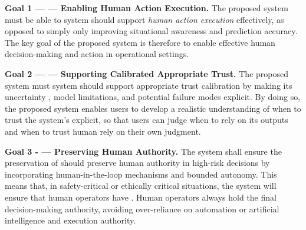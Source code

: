 \documentclass[journal]{IEEEtran}
\theoremstyle{plain}
\theoremstyle{definition}
\providecommand{\DIFaddtex}[1]{{\protect\color{blue} \sf #1}} %
\providecommand{\DIFdeltex}[1]{{\protect\color{red} \scriptsize #1}} %
\providecommand{\DIFaddbegin}{} %
\providecommand{\DIFaddend}{} %
\providecommand{\DIFdelbegin}{} %
\providecommand{\DIFdelend}{} %
\providecommand{\DIFadd}[1]{\texorpdfstring{\DIFaddtex{#1}}{#1}} %
\providecommand{\DIFdel}[1]{\texorpdfstring{\DIFdeltex{#1}}{}} %
\newcommand{\DIFscaledelfig}{0.5}
\newlength{\DIFdelgraphicswidth} %
\newlength{\DIFdelgraphicsheight} %
\newcommand{\DIFaddincludegraphics}[2][]{{\color{blue}\fbox{\DIFOincludegraphics[#1]{#2}}}} %
\newcommand{\DIFdelincludegraphics}[2][]{%
\sbox{\DIFdelgraphicsbox}{\DIFOincludegraphics[#1]{#2}}%
\settoboxwidth{\DIFdelgraphicswidth}{\DIFdelgraphicsbox} %
\settoboxtotalheight{\DIFdelgraphicsheight}{\DIFdelgraphicsbox} %
\scalebox{\DIFscaledelfig}{%
\parbox[b]{\DIFdelgraphicswidth}{\usebox{\DIFdelgraphicsbox}\\[-\baselineskip] \rule{\DIFdelgraphicswidth}{0em}}\llap{\resizebox{\DIFdelgraphicswidth}{\DIFdelgraphicsheight}{%
\setlength{\unitlength}{\DIFdelgraphicswidth}%
\begin{picture}(1,1)%
\thicklines\linethickness{2pt} %
{\color[rgb]{1,0,0}\put(0,0){\framebox(1,1){}}}%
{\color[rgb]{1,0,0}\put(0,0){\line( 1,1){1}}}%
{\color[rgb]{1,0,0}\put(0,1){\line(1,-1){1}}}%
\end{picture}%
}\hspace*{3pt}}} %
} %
\DeclareRobustCommand{\DIFaddbegin}{\DIFOaddbegin \let\includegraphics\DIFaddincludegraphics} %
\DeclareRobustCommand{\DIFaddend}{\DIFOaddend \let\includegraphics\DIFOincludegraphics} %
\DeclareRobustCommand{\DIFdelbegin}{\DIFOdelbegin \let\includegraphics\DIFdelincludegraphics} %
\DeclareRobustCommand{\DIFdelend}{\DIFOaddend \let\includegraphics\DIFOincludegraphics} %
\begin{document}
    \textbf{Goal 1 \DIFdelbegin \DIFdel{— }\DIFdelend \DIFaddbegin \DIFadd{--- }\DIFaddend Enabling Human Action Execution.}
    The \DIFdelbegin \DIFdel{proposed system must be able to }\DIFdelend \DIFaddbegin \DIFadd{system should }\DIFaddend support \emph{human action execution} effectively, as opposed to \DIFdelbegin \DIFdel{simply }\DIFdelend \DIFaddbegin \DIFadd{only }\DIFaddend improving situational awareness and prediction accuracy.
\DIFdelbegin \DIFdel{The key goal of the proposed system is therefore to enable effective human decision-making and action in operational settings.
}\DIFdelend 

    \textbf{Goal 2 \DIFdelbegin \DIFdel{— }\DIFdelend \DIFaddbegin \DIFadd{--- }\DIFaddend Supporting \DIFdelbegin \DIFdel{Calibrated }\DIFdelend \DIFaddbegin \DIFadd{Appropriate }\DIFaddend Trust.}
    The \DIFdelbegin \DIFdel{proposed system must }\DIFdelend \DIFaddbegin \DIFadd{system should }\DIFaddend support appropriate trust \DIFdelbegin \DIFdel{calibration }\DIFdelend \DIFaddbegin \DIFadd{\cite{Lee2004} }\DIFaddend by making its uncertainty \DIFdelbegin \DIFdel{, model limitations, and potential failure modes explicit. By doing so, the proposed system enables users to develop a realistic understanding of when to trust the system's }\DIFdelend \DIFaddbegin \DIFadd{explicit, so that users can judge when to rely on its }\DIFaddend outputs and when to \DIFdelbegin \DIFdel{trust human }\DIFdelend \DIFaddbegin \DIFadd{rely on their own }\DIFaddend judgment.

    \textbf{Goal 3 \DIFdelbegin \DIFdel{- }\DIFdelend \DIFaddbegin \DIFadd{--- }\DIFaddend Preserving Human Authority.}
    The system \DIFdelbegin \DIFdel{shall ensure the preservation of }\DIFdelend \DIFaddbegin \DIFadd{should preserve }\DIFaddend human authority in high-risk decisions\DIFdelbegin \DIFdel{by incorporating human-in-the-loop mechanisms and bounded autonomy. This means that, in safety-critical or ethically critical situations, the system will ensure that human operators have }\DIFdelend \DIFaddbegin \DIFadd{. Human operators always hold }\DIFaddend the final decision-making \DIFdelbegin \DIFdel{authority, avoiding over-reliance on automation or artificial intelligence}\DIFdelend \DIFaddbegin \DIFadd{and execution authority}\DIFaddend .
\end{document}
